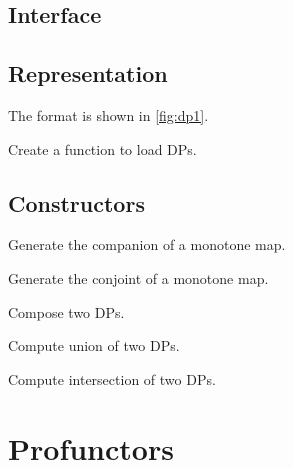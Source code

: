 \begin{exercise}
\subsection*{Interface}

\subsection*{Representation}


The format is shown in \cref{fig:dp1}.


\begin{exercise}
Create a function to load DPs.
%
\end{exercise}

\subsection*{Constructors}


\begin{exercise}
Generate the companion of a monotone map.
%
\end{exercise}

\begin{exercise}
Generate the conjoint of a monotone map.
%
%
\end{exercise}





\begin{exercise}
Compose two DPs.
%
\end{exercise}

\begin{exercise}
Compute union of two DPs.
%
\end{exercise}

\begin{exercise}
Compute intersection of two DPs.
%
\end{exercise}


\section{Profunctors}





\end{exercise}

